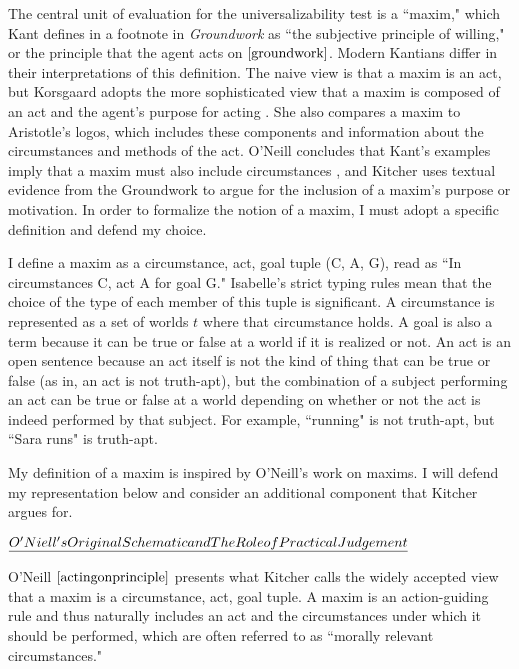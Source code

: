 \begin{isabellebody}
\begin{isamarkuptext}%
The central unit of evaluation for the universalizability test is a ``maxim," which Kant defines 
in a footnote in \emph{Groundwork} as ``the subjective principle of willing," or the principle that 
the agent acts on $\cite[16]{groundwork}$. Modern Kantians differ in their interpretations of this definition. The naive view 
is that a maxim is an act, but Korsgaard adopts the more sophisticated view that a maxim is composed
of an act and the agent's purpose for acting \cite{actingforareason}. She also compares a maxim 
to Aristotle's logos, which includes these components and information about the circumstances and methods 
of the act. O'Neill concludes that Kant's examples imply that a maxim must also include circumstances \cite{actingonprinciple}, and 
Kitcher \cite{whatisamaxim} uses textual evidence from the Groundwork to argue for the inclusion of a maxim's purpose 
or motivation. In order to formalize the notion of a maxim, I must adopt a specific definition and 
defend my choice.

I define a maxim as a circumstance, act, goal tuple (C, A, G), read 
as ``In circumstances C, act A for goal G." Isabelle's strict typing rules mean that the choice of the 
type of each member of this tuple is significant. A circumstance is represented as a set of worlds 
$t$ where that circumstance holds. A goal is also a term because it can be true or false at a world if it 
is realized or not. An act is an open sentence because an act itself is not the kind of thing that can 
be true or false (as in, an act is not truth-apt), but the combination of a subject performing an act 
can be true or false at a world depending on whether or not the act is indeed performed by that subject. 
For example, ``running" is not truth-apt, but ``Sara runs" is truth-apt.

My definition of a maxim is inspired by O'Neill's work on maxims. I will defend my representation
below and consider an additional component that Kitcher argues for.

$\emph{O'Niell's Original Schematic and The Role of Practical Judgement}$

O'Neill $\cite[37]{actingonprinciple}$ presents what Kitcher \cite{whatisamaxim}  calls the widely accepted 
view that a maxim is a circumstance, act, goal tuple. A maxim 
is an action-guiding rule and thus naturally includes an act and the circumstances under which 
it should be performed, which are often referred to as ``morally relevant circumstances." 


\end{isamarkuptext}
\end{isabellebody}

